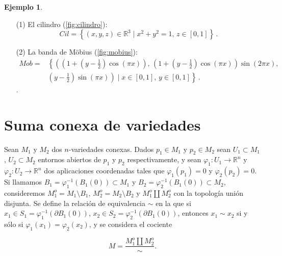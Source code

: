 \documentclass[10pt]{report}
\newcommand{\R}{\mathbb{R}}
\theoremstyle{definition}
\newtheorem{eje}[defin]{Ejemplo}
\begin{document}
\begin{eje}\label{eje:rep_borde}
\begin{itemize}
\item[(1)] El cilindro  (\autoref{fig:cilindro}): $$Cil=\left\{(x,y,z)\in \R^3 \mid x^2+y^2=1,\, z\in \left[ 0,1\right] \right\} \,.$$
\item[(2)] La banda de Möbius (\autoref{fig:mobius}):
\begin{align*}
Mob=
& \left\{ \left(\left(1+\left(y-\frac{1}{2}\right)\cos \left(\pi x\right)\right), \, \left(1+\left(y-\frac{1}{2}\right)\cos \left(\pi x\right)\right)\sin \left( 2 \pi x\right), \right. \right.\\
& \left. \left. \left( y-\frac{1}{2} \right)\sin \left( \pi x\right)\right) \mid x\in \left[0,1\right], \, y\in \left[0,1\right] \right\} \, .
\end{align*}.
\end{itemize}
\end{eje}

\section{Suma conexa de variedades}
Sean $M_1$ y $M_2$ dos $n$-variedades conexas. Dados $p_1\in M_1$ y $p_2\in M_2$ sean $U_1\subset M_1$, $U_2\subset M_2$  entornos abiertos de $p_1$ y $p_2$ respectivamente, y sean $\varphi_1:U_1\to\R^n$ y $\varphi_2:U_2\to\R^n$ dos aplicaciones coordenadas tales que $\varphi_1(p_1)=0$ y $\varphi_2(p_2)=0$. Si llamamos $B_1=\varphi_1^{-1}(B_1(0))\subset M_1$ y $B_2=\varphi_2^{-1}(B_1(0))\subset M_2$, consideremos $M_1^o=M_1\setminus B_1$, $M_2^o=M_2\setminus B_2$ y $M_1^o \amalg M_2^o$ con la topología unión disjunta.
Se define la relación de equivalencia $\sim$ en la que si $x_1\in S_1=\varphi_1^{-1}(\partial B_1(0))$, $x_2\in S_2=\varphi_2^{-1}(\partial B_1(0))$, entonces $x_1\sim x_2$ si y sólo si $\varphi_1(x_1)=\varphi_2(x_2)$, y se considera el cociente 

$$M=\frac{M_1^o\amalg M_2^o}{\sim}.$$
\end{document}
